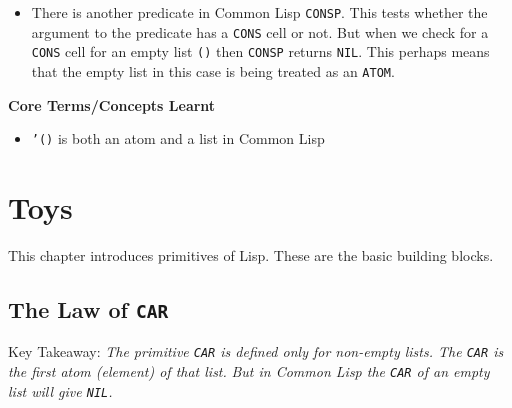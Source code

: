 \documentclass[11pt]{article}
\begin{document}
\begin{itemize}
\begin{verbatim}
(atom '())
» T
\end{verbatim}

We define our own predicate \texttt{ATOMP}

\begin{verbatim}
(defun atom? (x)
  (not (listp x)))
\end{verbatim}

So now \texttt{ATOMP} for our studies of this book will give \texttt{NIL} when tested for an empty list \texttt{'()}

\begin{verbatim}
(atom? '())
» NIL
\end{verbatim}

\item There is another predicate in Common Lisp \texttt{CONSP}. This tests whether the argument to the predicate has a \texttt{CONS}
cell or not. But when we check for a \texttt{CONS} cell for an empty list \texttt{()} then \texttt{CONSP} returns \texttt{NIL}. This perhaps
means that the empty list in this case is being treated as an \texttt{ATOM}.
\end{itemize}

\textbf{Core Terms/Concepts Learnt}
\begin{itemize}
\item \texttt{'()} is both an atom and a list in Common Lisp
\end{itemize}


\newpage
\section{Toys}
\label{sec:org07147a8}

This chapter introduces primitives of Lisp. These are the basic building blocks.

\vspace{1em}

\subsection{The Law of \texttt{CAR}}
\label{sec:org3ebb866}
Key Takeaway:
\emph{The primitive \texttt{CAR} is defined only for non-empty lists. The \texttt{CAR} is the first atom (element) of that list.}
\emph{But in Common Lisp the \texttt{CAR} of an empty list will give \texttt{NIL}.}

\vspace{1em}
\end{document}
